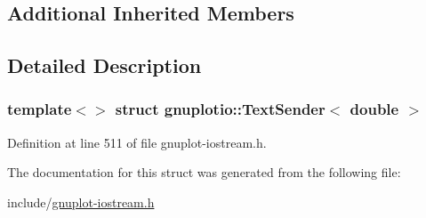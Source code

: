 \subsection*{Additional Inherited Members}


\subsection{Detailed Description}
\subsubsection*{template$<$$>$\newline
struct gnuplotio\+::\+Text\+Sender$<$ double $>$}



Definition at line 511 of file gnuplot-\/iostream.\+h.



The documentation for this struct was generated from the following file\+:\begin{DoxyCompactItemize}
\item 
include/\hyperlink{gnuplot-iostream_8h}{gnuplot-\/iostream.\+h}\end{DoxyCompactItemize}
